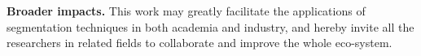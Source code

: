 \documentclass[10pt,twocolumn,letterpaper]{article}
\begin{document}
\noindent\textbf{Broader impacts.} 
This work may greatly facilitate the applications of segmentation techniques in both academia and industry, and hereby invite all the researchers in related fields to collaborate and improve the whole eco-system. 
\end{document}
